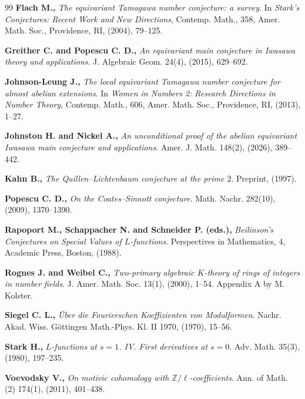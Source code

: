 \documentclass[a4paper,11pt]{article}
\begin{document}
\begin{thebibliography}{99}
{\bf Flach M.,}
\textit{The equivariant Tamagawa number conjecture: a survey}.
In \textit{Stark's Conjectures: Recent Work and New Directions},
Contemp. Math., 358, Amer. Math. Soc., Providence, RI, (2004), 79--125.

{\bf Greither C. and Popescu C. D.,}
\textit{An equivariant main conjecture in Iwasawa theory and applications}.
J. Algebraic Geom. 24(4), (2015), 629--692.

{\bf Johnson-Leung J.,}
\textit{The local equivariant Tamagawa number conjecture for almost abelian
extensions}.
In \textit{Women in Numbers 2: Research Directions in Number Theory},
Contemp. Math., 606, Amer. Math. Soc., Providence, RI, (2013), 1--27.

{\bf Johnston H. and Nickel A.,}
\textit{An unconditional proof of the abelian equivariant Iwasawa main
conjecture and applications}.
Amer. J. Math. 148(2), (2026), 389--442.

{\bf Kahn B.,}
\textit{The Quillen--Lichtenbaum conjecture at the prime \(2\)}.
Preprint, (1997).

{\bf Popescu C. D.,}
\textit{On the Coates--Sinnott conjecture}.
Math. Nachr. 282(10), (2009), 1370--1390.

{\bf Rapoport M., Schappacher N. and Schneider P. (eds.),}
\textit{Beilinson's Conjectures on Special Values of \(L\)-functions}.
Perspectives in Mathematics, 4, Academic Press, Boston, (1988).

{\bf Rognes J. and Weibel C.,}
\textit{Two-primary algebraic \(K\)-theory of rings of integers in number
fields}.
J. Amer. Math. Soc. 13(1), (2000), 1--54. Appendix A by M. Kolster.

{\bf Siegel C. L.,}
\textit{\"Uber die Fourierschen Koeffizienten von Modulformen}.
Nachr. Akad. Wiss. G\"ottingen Math.-Phys. Kl. II 1970, (1970), 15--56.

{\bf Stark H.,}
\textit{\(L\)-functions at \(s=1\). IV. First derivatives at \(s=0\)}.
Adv. Math. 35(3), (1980), 197--235.

{\bf Voevodsky V.,}
\textit{On motivic cohomology with \(\mathbb Z/\ell\)-coefficients}.
Ann. of Math. (2) 174(1), (2011), 401--438.

\end{thebibliography}
\end{document}
